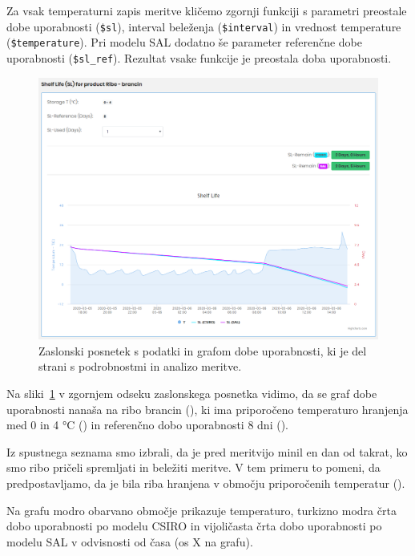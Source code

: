 \documentclass[a4paper, 12pt]{book}
\begin{document}
Za vsak temperaturni zapis meritve kličemo zgornji funkciji s parametri preostale dobe uporabnosti (\verb=$sl=), interval beleženja (\verb=$interval=) in vrednost temperature (\verb=$temperature=). Pri modelu SAL dodatno še parameter referenčne dobe uporabnosti (\verb=$sl_ref=). Rezultat vsake funkcije je preostala doba uporabnosti.

\clearpage

\begin{figure}[h]
\begin{center}
\includegraphics[width=\textwidth]{slike/record_page_sl_final.png}
\end{center}
\caption{Zaslonski posnetek s podatki in grafom dobe uporabnosti, ki je del strani s podrobnostmi in analizo meritve.}
\label{ss-record-page-sl}
\end{figure}

Na sliki~\ref{ss-record-page-sl} v zgornjem odseku zaslonskega posnetka vidimo, da se graf dobe uporabnosti nanaša na ribo brancin (), ki ima priporočeno temperaturo hranjenja med 0 in 4 °C () in referenčno dobo uporabnosti 8 dni ().

Iz spustnega seznama smo izbrali, da je pred meritvijo minil en dan od takrat, ko smo ribo pričeli spremljati in beležiti meritve. V tem primeru to pomeni, da predpostavljamo, da je bila riba hranjena v območju priporočenih temperatur ().

Na grafu modro obarvano območje prikazuje temperaturo, turkizno modra črta dobo uporabnosti po modelu CSIRO in vijoličasta črta dobo uporabnosti po modelu SAL v odvisnosti od časa (os X na grafu).
\end{document}
